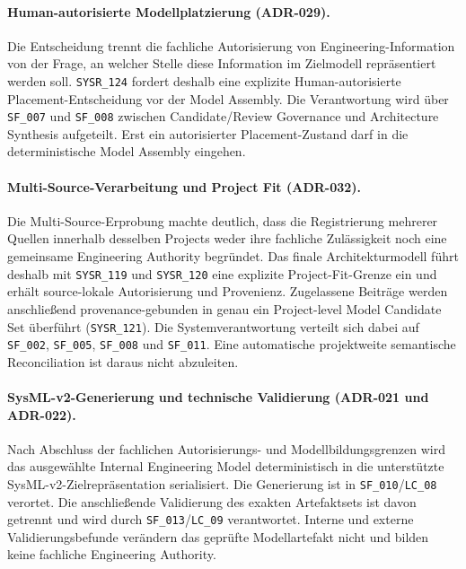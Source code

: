 \paragraph{Human-autorisierte Modellplatzierung (ADR-029).}
Die Entscheidung trennt die fachliche Autorisierung von Engineering-Information
von der Frage, an welcher Stelle diese Information im Zielmodell repräsentiert
werden soll. \texttt{SYSR\_124} fordert deshalb eine explizite
Human-autorisierte Placement-Entscheidung vor der Model Assembly. Die
Verantwortung wird über \texttt{SF\_007} und \texttt{SF\_008} zwischen
Candidate/Review Governance und Architecture Synthesis aufgeteilt. Erst ein
autorisierter Placement-Zustand darf in die deterministische Model Assembly
eingehen.

\paragraph{Multi-Source-Verarbeitung und Project Fit (ADR-032).}
Die Multi-Source-Erprobung machte deutlich, dass die Registrierung mehrerer
Quellen innerhalb desselben Projects weder ihre fachliche Zulässigkeit noch
eine gemeinsame Engineering Authority begründet. Das finale Architekturmodell
führt deshalb mit \texttt{SYSR\_119} und \texttt{SYSR\_120} eine explizite
Project-Fit-Grenze ein und erhält source-lokale Autorisierung und Provenienz.
Zugelassene Beiträge werden anschließend provenance-gebunden in genau ein
Project-level Model Candidate Set überführt (\texttt{SYSR\_121}). Die
Systemverantwortung verteilt sich dabei auf \texttt{SF\_002},
\texttt{SF\_005}, \texttt{SF\_008} und \texttt{SF\_011}. Eine automatische
projektweite semantische Reconciliation ist daraus nicht abzuleiten.

\paragraph{SysML-v2-Generierung und technische Validierung
(ADR-021 und ADR-022).}
Nach Abschluss der fachlichen Autorisierungs- und Modellbildungsgrenzen wird
das ausgewählte Internal Engineering Model deterministisch in die unterstützte
SysML-v2-Zielrepräsentation serialisiert. Die Generierung ist in
\texttt{SF\_010}/\texttt{LC\_08} verortet. Die anschließende Validierung des
exakten Artefaktsets ist davon getrennt und wird durch
\texttt{SF\_013}/\texttt{LC\_09} verantwortet. Interne und externe
Validierungsbefunde verändern das geprüfte Modellartefakt nicht und bilden
keine fachliche Engineering Authority.

